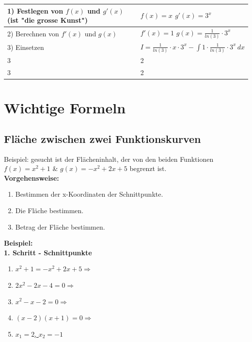 \documentclass[12pt]{scrartcl}
\begin{document}
\renewcommand{\arraystretch}{1.5}
\begin{center}
    \begin{tabular}{ | m{18em} | m{18em} | }
        \hline
        1) Festlegen von $f(x)$ und $g'(x)$ (ist "die grosse Kunst") & $f(x) = x$ \newline $ g'(x) = 3^x $ \\ 
        \hline
        2) Berechnen von $f'(x)$ und $g(x)$ & $f'(x) = 1$ \newline $g(x) = \frac{1}{ln(3)} \cdot 3^x $ \\ 
        \hline
        3) Einsetzen & $I = \frac{1}{ln(3)} \cdot x \cdot 3^x - \int 1 \cdot \frac{1}{ln(3)} \cdot 3^x \, dx$ \\ 
        \hline
        3 & 2 \\ 
        \hline
        3 & 2 \\ 
        \hline
    \end{tabular}
\end{center}


\newpage
\section{Wichtige Formeln}
\subsection{Fläche zwischen zwei Funktionskurven}
Beispiel: gesucht ist der Flächeninhalt, der von den beiden Funktionen $f(x) = x^2 + 1$ \& $g(x) = -x^2 + 2x + 5$
begrenzt ist.\\


\textbf{Vorgehensweise:}
\begin{enumerate}
    \item Bestimmen der x-Koordinaten der Schnittpunkte.
    \item Die Fläche bestimmen.
    \item Betrag der Fläche bestimmen.
\end{enumerate}

\hfill \break

\textbf{Beispiel:}\\
\textbf{1. Schritt - Schnittpunkte}
\begin{enumerate}
    \item $x^2 + 1 = -x^2 + 2x + 5 \Rightarrow$
    \item $2x^2 -2x -4 = 0 \Rightarrow $
    \item $x^2 - x - 2 = 0 \Rightarrow$
    \item $(x-2)(x+1) = 0 \Rightarrow$
    \item \underline{$x_1 = 2$, $x_2 = -1$}
\end{enumerate}
\end{document}
